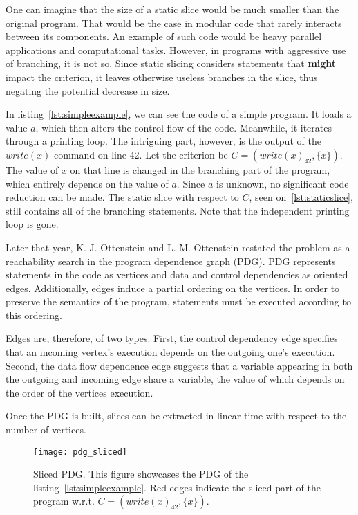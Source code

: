 One can imagine that the size of a static slice would be much smaller
than the original program. 
That would be the case in modular code that rarely interacts between
its components. 
An example of such code would be heavy parallel applications and 
computational tasks. 
However, in programs with aggressive use of branching, it is not so. 
Since static slicing considers statements that \textbf{might} 
impact the criterion, it leaves otherwise useless branches in the slice,
thus negating the potential decrease in size. 

In listing~\ref{lst:simpleexample}, we can see the code of a simple program.
It loads a value $a$, which then alters the control-flow of the code.
Meanwhile, it iterates through a printing loop. 
The intriguing part, however, is the output of the $write(x)$ 
command on line $42$. 
Let the criterion be $C = (write(x)_{42}, \{x\})$. 
The value of $x$ on that line is changed in the branching 
part of the program, which entirely depends on the value of $a$.
Since $a$ is unknown, no significant code reduction can be made. 
The static slice with respect to $C$, seen on~\ref{lst:staticslice}, 
still contains all of the branching statements. 
Note that the independent printing loop is gone.

Later that year, K. J. Ottenstein and L. M. Ottenstein \citep*{Ottenstein84}
restated the problem as a reachability
search in the program dependence graph (PDG).
PDG represents statements in the code as vertices and data and control
dependencies as oriented edges. 
Additionally, edges induce a partial ordering on the vertices. 
In order to preserve the semantics of the program, statements must be executed 
according to this ordering. 

Edges are, therefore, of two types. 
First, the control dependency edge specifies that an incoming vertex's 
execution depends on the outgoing one's execution. 
Second, the data flow dependence edge suggests that a variable appearing
in both the outgoing and incoming edge share a variable,
the value of which depends on the order of the vertices execution.

Once the PDG is built, slices can be extracted in linear time 
with respect to the number of vertices.

\begin{figure}[h]\centering
\texttt{[image: pdg\_sliced]}
\caption{Sliced PDG. This figure showcases 
the PDG of the listing~\ref{lst:simpleexample}.
Red edges indicate the sliced part of the program w.r.t.
$C = (write(x)_{42}, \{x\})$.}
\label{img:pdg}
\end{figure}

